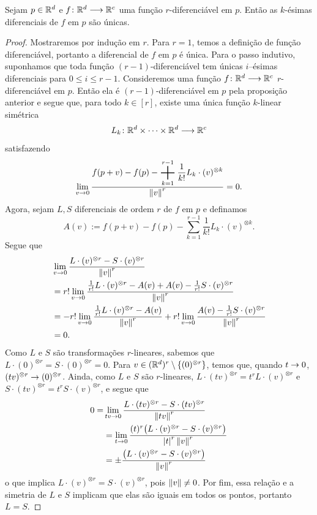 \begin{prop}
Sejam $p \in \mathbb{R}^d$ e $f\colon \mathbb{R}^d \longrightarrow \mathbb{R}^c$ uma função $r$-diferenciável em $p$. Então as $k$-ésimas diferenciais de $f$ em $p$ são únicas.
\end{prop}
\begin{proof}
Mostraremos por indução em $r$. Para $r=1$, temos a definição de função diferenciável, portanto a diferencial de $f$ em $p$ é única. Para o passo indutivo, suponhamos que toda função $(r-1)$-diferenciável tem únicas $i$--ésimas diferenciais para $0\leq i \leq r-1$. Consideremos uma função $f\colon \mathbb{R}^d \longrightarrow \mathbb{R}^c$ $r$-diferenciável em $p$. Então ela é $(r-1)$-diferenciável em $p$ pela proposição anterior e segue que, para todo $k \in [r]$, existe uma única função $k$-linear simétrica
	\begin{equation*}
	L_k\colon \mathbb{R}^d \times \cdots \times \mathbb{R}^d \longrightarrow \mathbb{R}^c
	\end{equation*}
satisfazendo
	\begin{equation*}
	\lim_{v \conv 0} \frac{\displaystyle f(p+v)-f(p)- \sum_{k=1}^{r-1} \frac{1}{k!}L_k \cdot (v)^{\otimes k}}{\nor{v}^r} = 0.
	\end{equation*}
Agora, sejam $L,S$ diferenciais de ordem $r$ de $f$ em $p$ e definamos
	\begin{equation*}
	A(v) := f(p+v)-f(p)- \sum_{k=1}^{r-1} \frac{1}{k!}L_k \cdot (v)^{\otimes k}.
	\end{equation*}
Segue que
	\begin{align*}
	&\lim_{v \rightarrow 0} \frac{L \cdot (v)^{\otimes r} - S \cdot (v)^{\otimes r}}{\left\Vert{v}\right\Vert^r} \\
	&= r! \lim_{v \rightarrow 0} \frac{\frac{1}{r!} L \cdot (v)^{\otimes r} - A(v) + A(v) - \frac{1}{r!} S \cdot (v)^{\otimes r}}{\left\Vert{v}\right\Vert^r} \\
	&= -r!\lim_{v \rightarrow 0} \frac{\frac{1}{r!} L \cdot (v)^{\otimes r} - A(v)}{\left\Vert{v}\right\Vert^r} + r!\lim_{v \rightarrow 0} \frac{A(v) - \frac{1}{r!} S \cdot (v)^{\otimes r}}{\left\Vert{v}\right\Vert^r} \\
	&= 0.
	\end{align*}
Como $L$ e $S$ são transformações $r$-lineares, sabemos que $L \cdot (0)^{\otimes r} = S \cdot (0)^{\otimes r} =0$. Para $v \in (\mathbb{R}^d)^r \setminus\{(0)^{\otimes r}\}$, temos que, quando $t \rightarrow 0$, $(tv)^{\otimes r} \rightarrow (0)^{\otimes r}$. Ainda, como $L$ e $S$ são $r$-lineares, $L \cdot (tv)^{\otimes r} = t^rL \cdot (v)^{\otimes r}$ e $S \cdot (tv)^{\otimes r} = t^rS \cdot (v)^{\otimes r}$, e segue que
	\begin{align*}
	0= &\lim_{tv \rightarrow 0} \frac{L \cdot (tv)^{\otimes r} -  S \cdot (tv)^{\otimes r}}{\left\Vert{tv}\right\Vert^r} \\
	&= \lim_{t \rightarrow 0} \frac{(t)^r\big(L \cdot (v)^{\otimes r} -  S \cdot (v)^{\otimes r}\big)}{\left\vert{t}\right\vert^r\left\Vert{v}\right\Vert^r} \\
	&= \pm \frac{\big(L \cdot (v)^{\otimes r} -  S \cdot (v)^{\otimes r}\big)}{\left\Vert{v}\right\Vert^r}
	\end{align*}
o que implica $L \cdot (v)^{\otimes r} =  S \cdot (v)^{\otimes r}$, pois $\left\Vert{v}\right\Vert \neq 0$. Por fim, essa relação e a simetria de $L$ e $S$ implicam que elas são iguais em todos os pontos, portanto $L=S$.
\end{proof}

